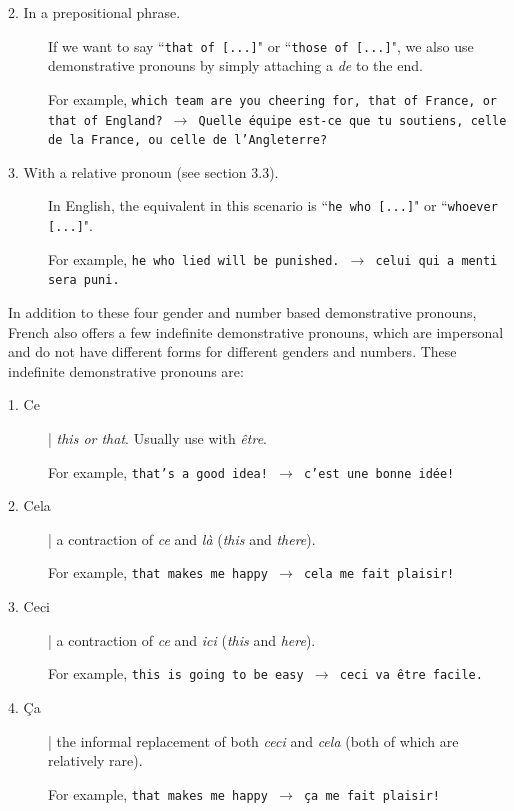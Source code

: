 \documentclass[11pt, oneside]{book}
\begin{document}
{{{\begin{description}
	\item[2. In a prepositional phrase.] If we want to say ``\texttt{that of [...]}" or ``\texttt{those of [...]}", we also use demonstrative pronouns by simply attaching a \textit{de} to the end. 

		For example, \texttt{which team are you cheering for, that of France, or that of England? $\rightarrow$ Quelle \'equipe est-ce que tu soutiens, celle de la France, ou celle de l'Angleterre?}
		
	\item[3. With a relative pronoun (see section 3.3).] In English, the equivalent in this scenario is ``\texttt{he who [...]}"  or ``\texttt{whoever [...]}". 
	
		For example, \texttt{he who lied will be punished. $\rightarrow$ celui qui a menti sera puni.}

\end{description}

In addition to these four gender and number based demonstrative pronouns, French also offers a few indefinite demonstrative pronouns, which are impersonal and do not have different forms for different genders and numbers. These indefinite demonstrative pronouns are: \vspace{0.5\baselineskip}


\begin{description}
	\item[1. Ce] | \textit{this or that}. Usually use with \textit{\^etre}.
	
	For example, \texttt{that's a good idea! $\rightarrow$ c'est une bonne id\'ee!}
	
	\item[2. Cela] | a contraction of \textit{ce} and \textit{l\`a} (\textit{this} and \textit{there}). 
	
	For example, \texttt{that makes me happy $\rightarrow$ cela me fait plaisir!}
	
	\item[3. Ceci] | a contraction of \textit{ce} and \textit{ici} (\textit{this} and \textit{here}). 
	
	For example, \texttt{this is going to be easy $\rightarrow$ ceci va \^etre facile.}
	
	\item[4. \c{C}a] |  the informal replacement of both \textit{ceci} and \textit{cela} (both of which are relatively rare).
	
	For example, \texttt{that makes me happy $\rightarrow$ \c{c}a me fait plaisir!}
\end{description}
		
}}}
\end{document}
